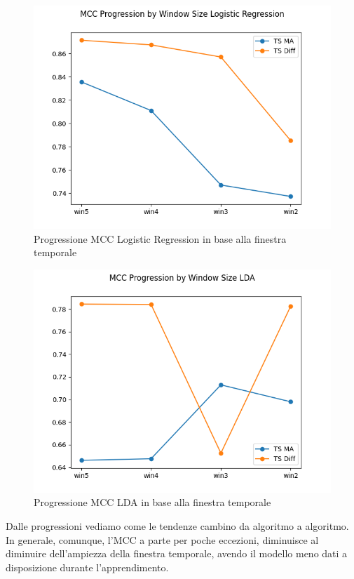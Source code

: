 \vspace{3cm}

\begin{figure}[H]
    \centering
    \includegraphics[width=0.78\linewidth]{MCC_Progression_by_Window_Size_Logistic Regression.png}
    \caption{Progressione MCC Logistic Regression in base alla finestra temporale}
    \label{fig:enter-label}
\end{figure}

\begin{figure}[H]
    \centering
    \includegraphics[width=0.78\linewidth]{MCC_Progression_by_Window_Size_LDA.png}
    \caption{Progressione MCC LDA in base alla finestra temporale}
    \label{fig:enter-label}
\end{figure}

\vspace{0.5 cm}

Dalle progressioni vediamo come le tendenze cambino da algoritmo a algoritmo. In generale, comunque, l'MCC a parte per poche eccezioni, diminuisce al diminuire dell'ampiezza della finestra temporale, avendo il modello meno dati a disposizione durante l'apprendimento.
\newpage


